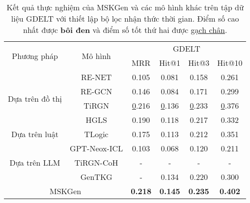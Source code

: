 \begin{table}
\caption{Kết quả thực nghiệm của MSKGen và các mô hình khác trên tập dữ liệu GDELT với thiết lập bộ lọc nhận thức thời gian. 
Điểm số cao nhất được \textbf{bôi đen} và điểm số tốt thứ hai được \underline{gạch chân}.}
\label{tab:table55}
\begin{adjustbox}{width=\textwidth}
\begin{tabular}{|cc|cccc|}
\hline
\multicolumn{1}{|c|}{\multirow{2}{*}{Phương pháp}}     & \multirow{2}{*}{Mô hình} & \multicolumn{4}{c|}{GDELT}                                                                          \\ \cline{3-6} 
\multicolumn{1}{|c|}{}                                 &                          & \multicolumn{1}{c|}{MRR} & \multicolumn{1}{c|}{Hit@1} & \multicolumn{1}{c|}{Hit@3} & Hit@10         \\ \hline
\multicolumn{1}{|c|}{\multirow{4}{*}{Dựa trên đồ thị}} & RE-NET                   & 0.105                    & 0.081                      & 0.158                      & 0.261          \\ \cline{2-2}
\multicolumn{1}{|c|}{}                                 & RE-GCN                   & 0.146                    & 0.084                      & 0.171                      & 0.299          \\ \cline{2-2}
\multicolumn{1}{|c|}{}                                 & TiRGN                    & {\ul 0.216}              & {\ul 0.136}                & {\ul 0.233}                & {\ul 0.376}    \\ \cline{2-2}
\multicolumn{1}{|c|}{}                                 & HGLS                     & 0.190                    & 0.118                      & 0.217                      & 0.332          \\ \hline
\multicolumn{1}{|c|}{Dựa trên luật}                    & TLogic                   & 0.175                    & 0.113                      & 0.212                      & 0.351          \\ \hline
\multicolumn{1}{|c|}{\multirow{3}{*}{Dựa trên LLM}}    & GPT-Neox-ICL             & 0.103                    & 0.068                      & 0.120                      & 0.211          \\ \cline{2-2}
\multicolumn{1}{|c|}{}                                 & TiRGN-CoH                & -                        & -                          & -                          & -              \\ \cline{2-2}
\multicolumn{1}{|c|}{}                                 & GenTKG                   & -                        & 0.134                      & 0.220                      & 0.300          \\ \hline
\multicolumn{2}{|c|}{MSKGen}                                                      & \textbf{0.218}           & \textbf{0.145}             & \textbf{0.235}             & \textbf{0.402} \\ \hline
\end{tabular}
\end{adjustbox}  
\end{table}
\vspace{-5mm}

